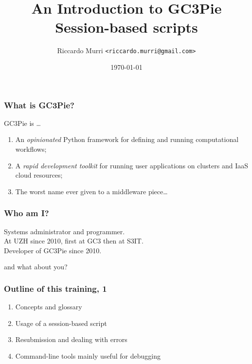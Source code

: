 \documentclass[english,serif,mathserif,usenames,dvipsnames]{beamer}
\begin{document}
\title[GC3Pie Tools]{An Introduction to GC3Pie Session-based scripts}
\author{Riccardo Murri \texttt{<riccardo.murri@gmail.com>}}
\date{\today}

\maketitle

%

\begin{frame}
  \frametitle{What is GC3Pie?}
  GC3Pie is \ldots
  \begin{enumerate}
  \item An \emph{opinionated} Python framework for defining and running computational workflows;
  \item \alert<2->{A \emph{rapid development toolkit} for running user applications on clusters and IaaS cloud resources;}
  \item The worst name ever given to a middleware piece\ldots
  \end{enumerate}

\end{frame}


\begin{frame}
  \frametitle{Who am I?}
  \begin{center}
    Systems administrator and programmer.
    \\ \+
    At UZH since 2010, first at GC3 then at S3IT.
    \\ \+
    Developer of GC3Pie since 2010.
  \end{center}
\end{frame}


\begin{frame}
  \begin{center}
    {\Huge and what about you?}
  \end{center}
\end{frame}


\begin{frame}
  \frametitle{Outline of this training, 1}
  \begin{enumerate}
  \item Concepts and glossary
  \item Usage of a session-based script
  \item Resubmission and dealing with errors
  \item Command-line tools mainly useful for debugging
  \end{enumerate}
\end{frame}
\end{document}
